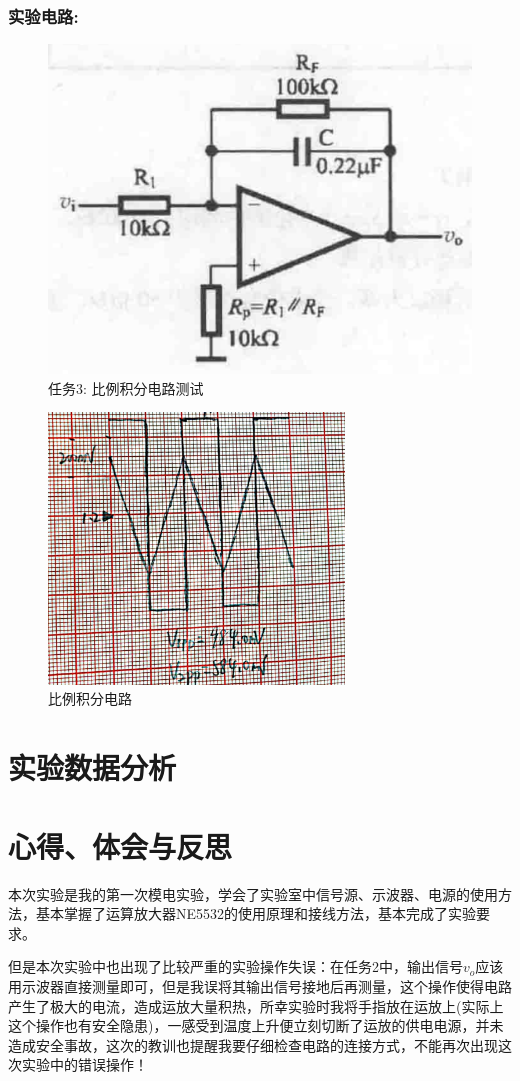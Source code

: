 \documentclass[a4paper,11pt,UTF8]{article}
\begin{document}
\subsubsection{实验电路:}
\begin{figure}[H]
	\centering
	\includegraphics[scale=0.18]{1.4}
	\caption*{任务3: 比例积分电路测试}
\end{figure}
\begin{figure}[H]
	\centering
	\includegraphics[width=0.7\textwidth]{1.12}
	\caption*{比例积分电路}
\end{figure}
\section{实验数据分析}
\section{心得、体会与反思}
本次实验是我的第一次模电实验，学会了实验室中信号源、示波器、电源的使用方法，基本掌握了运算放大器NE5532的使用原理和接线方法，基本完成了实验要求。

但是本次实验中也出现了比较严重的实验操作失误：在任务2中，输出信号$v_o$应该用示波器直接测量即可，但是我误将其输出信号接地后再测量，这个操作使得电路产生了极大的电流，造成运放大量积热，所幸实验时我将手指放在运放上(实际上这个操作也有安全隐患)，一感受到温度上升便立刻切断了运放的供电电源，并未造成安全事故，这次的教训也提醒我要仔细检查电路的连接方式，不能再次出现这次实验中的错误操作！
\end{document}
